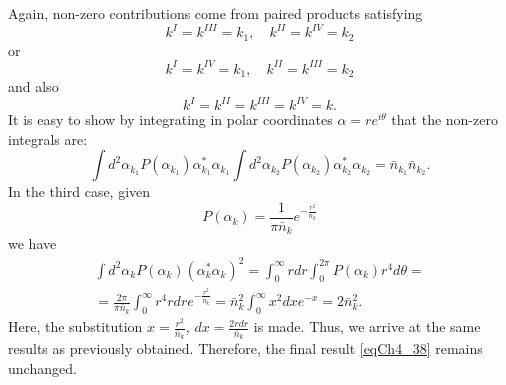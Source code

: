 Again, non-zero contributions come from paired products satisfying
\[
k^{I} = k^{III} = k_1, \quad k^{II} = k^{IV} = k_2
\]
or
\[
k^{I} = k^{IV} = k_1, \quad k^{II} = k^{III} = k_2
\]
and also
\[
k^{I} = k^{II} =  k^{III} = k^{IV} = k.
\]   
It is easy to show by integrating in polar coordinates $\alpha = r e^{i\theta}$ that the non-zero integrals are:
\begin{equation}
\int d^2 \alpha_{k_1} P\left(\alpha_{k_1}\right)
\alpha_{k_1}^{*} \alpha_{k_1}
\int d^2 \alpha_{k_2} P\left(\alpha_{k_2}\right)
\alpha_{k_2}^{*} \alpha_{k_2} = 
\bar{n}_{k_1} \bar{n}_{k_2}.
\nonumber
\end{equation}
In the third case, given 
\[
P\left(\alpha_k\right) = \frac{1}{\pi \bar{n}_k}e^{-\frac{r^2}{\bar{n}_k}}
\]
we have
\begin{eqnarray}
\int d^2\alpha_k P\left(\alpha_k\right)
\left(\alpha_k^{*}\alpha_k\right)^2 = 
\int_0^{\infty}r dr \int_0^{2\pi}P\left(\alpha_k\right) r^4 d \theta = 
\nonumber \\
= \frac{2 \pi}{\pi \bar{n}_k}\int_0^{\infty} r^4 r dr e^{-
  \frac{r^2}{\bar{n}_k}} = 
\bar{n}_k^2 \int_0^{\infty}x^2 d x e^{-x} = 2 \bar{n}_k^2.
\nonumber
\end{eqnarray}
Here, the substitution $x = \frac{r^2}{\bar{n}_k}$, $dx = \frac{2 r dr}{\bar{n}_k}$ is made.
Thus, we arrive at the same results as previously obtained. Therefore, the final result \eqref{eqCh4_38} remains unchanged.